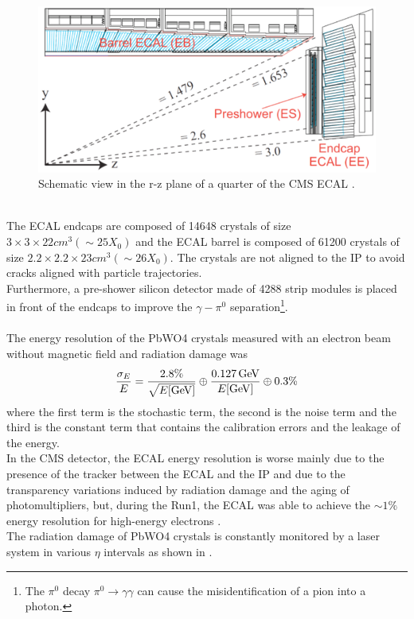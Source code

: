 \begin{figure}[h!]
    \centering
    \includegraphics[width=0.7\linewidth]{fig/chap03-cms/ecal.png}
    \caption{Schematic view in the r-z plane of a quarter of the CMS ECAL \cite{Benaglia2014TheExamples}.}
    \label{fig:ecal}
\end{figure}
\\
The ECAL endcaps are composed of 14648 crystals of size $3\times3\times22 cm^3 (\sim25X_0)$ and the ECAL barrel is composed of 61200 crystals of size $2.2\times2.2\times23 cm^3 (\sim26X_0)$. The crystals are not aligned to the IP to avoid cracks aligned with particle trajectories.\\
Furthermore, a pre-shower silicon detector made of 4288 strip modules is placed in front of the endcaps to improve the $\gamma-\pi^0$ separation\footnote{The $\pi^0$ decay $\pi^0 \to \gamma \gamma$ can cause the misidentification of a pion into a photon.}.
\\
\\
The energy resolution of the PbWO4 crystals measured with an electron beam without magnetic field and radiation damage was \cite{Adzic2007EnergyCalorimeter} 
\begin{equation}
    {\frac{\sigma_{E}}{E}}={\frac{2.8\%}{\sqrt{E[{\mathrm{GeV}}]}}}\oplus{\frac{0.127 {\ensuremath{\,\text{Ge\hspace{-.08em}V}}}}{E[{\mathrm{GeV}}]}}\oplus0.3\%
\end{equation}
where the first term is the stochastic term, the second is the noise term and the third is the constant term that contains the calibration errors and the leakage of the energy.\\
In the CMS detector, the ECAL energy resolution is worse mainly due to the presence of the tracker between the ECAL and the IP and due to the transparency variations induced by radiation damage and the aging of photomultipliers, but, during the Run1, the ECAL was able to achieve the $\sim1\%$ energy resolution for high-energy electrons \cite{Chatrchyan2013EnergyTeV}.\\
The radiation damage of PbWO4 crystals is constantly monitored by a laser system in various $\eta$ intervals as shown in .
